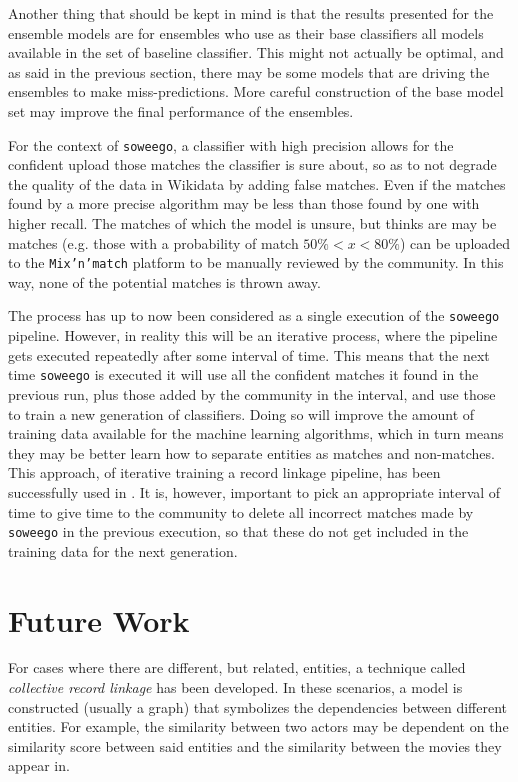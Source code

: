 \documentclass[epsfig,a4paper,11pt,titlepage,twoside,openany]{book}
\newcommand{\soweego}[0]{\texttt{soweego}\xspace}
\begin{document}
Another thing that should be kept in mind is that the results presented for the ensemble models are for ensembles who use as their base classifiers all models available in the set of baseline classifier. This might not actually be optimal, and as said in the previous section, there may be some models that are driving the ensembles to make miss-predictions. More careful construction of the base model set may improve the final performance of the ensembles. 

For the context of \soweego, a classifier with high precision allows for the confident upload those matches the classifier is sure about, so as to not degrade the quality of the data in Wikidata by adding false matches. Even if the matches found by a more precise algorithm may be less than those found by one with higher recall. The matches of which the model is unsure, but thinks are may be matches (e.g. those with a probability of match $50\% < x < 80\%$) can be uploaded to the \texttt{Mix'n'match} platform to be manually reviewed by the community. In this way, none of the potential matches is thrown away.

The process has up to now been considered as a single execution of the \soweego pipeline. However, in reality this will be an iterative process, where the pipeline gets executed repeatedly after some interval of time. This means that the next time \soweego is executed it will use all the confident matches it found in the previous run, plus those added by the community in the interval, and use those to train a new generation of classifiers. Doing so will improve the amount of training data available for the machine learning algorithms, which in turn means they may be better learn how to separate entities as matches and non-matches. This approach, of iterative training a record linkage pipeline, has been successfully used in \cite{Bhattacharya:2004_iterative}. It is, however, important to pick an appropriate interval of time to give time to the community to delete all incorrect matches made by \soweego in the previous execution, so that these do not get included in the training data for the next generation. 



\section{Future Work}
\label{sec:future-work}

For cases where there are different, but related, entities, a technique called \textit{collective record linkage} \cite{Kalashnikov2006_collective_graph,Dong2005_reference_reconciliation,bhattacharya07_collec_entit_resol_relat_data} has been developed. In these scenarios, a model is constructed (usually a graph) that symbolizes the dependencies between different entities. For example, the similarity between two actors may be dependent on the similarity score between said entities and the similarity between the  movies they appear in.
\end{document}

